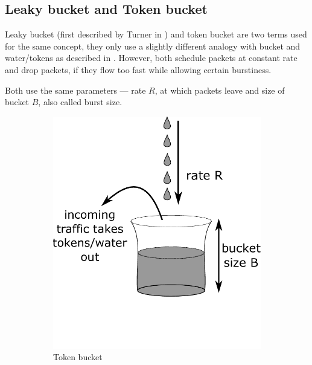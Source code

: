 \subsection{Leaky bucket and Token bucket}
\label{token_bucket}
Leaky bucket (first described by Turner in \cite{turner1986new}) and token bucket are two terms used for the same concept, they only use a slightly different analogy with bucket and water/tokens as described in \cite[Section 5.4.2]{Tanenbaum:2002:CN:572404}. However, both schedule packets at constant rate and drop packets, if they flow too fast while allowing certain burstiness.

Both use the same parameters --- rate $R$, at which packets leave and size of bucket $B$, also called burst size.

\begin{figure}
	\centering
	\begin{subfigure}{.6\linewidth}
		\centering
		\includegraphics[width=.9\linewidth]{drawings/token_bucket}
		\caption{Token bucket}
		\label{fig08:token}
	\end{subfigure}%
	\begin{subfigure}{.4\linewidth}
		\centering

\end{subfigure}
\end{figure}
